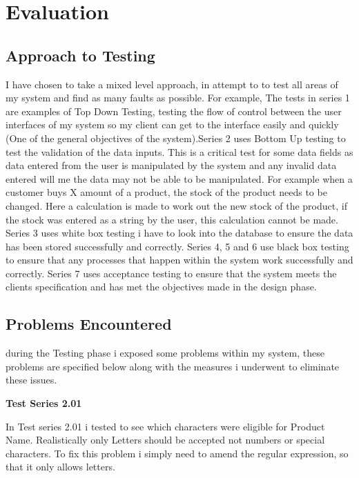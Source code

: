 \section{Evaluation}

\subsection{Approach to Testing}

I have chosen to take a mixed level approach, in attempt to to test all areas of my system and find as many faults as possible. For example,  The tests in series 1 are examples of Top Down Testing, testing the flow of control between the user interfaces of my system so my client can get to the interface easily and quickly (One of the general objectives of the system).Series 2 uses Bottom Up testing to test the validation of the data inputs. This is a critical test for some data fields as data entered from the user is manipulated by the system and any invalid data entered will me the data may not be able to be manipulated. For example when a customer buys X amount of a product, the stock of the product needs to be changed. Here a calculation is made to work out the new stock of the product, if the stock was entered as a string by the user, this calculation cannot be made. Series 3 uses white box testing i have to look into the database to ensure the data has been stored successfully and correctly. Series 4, 5 and 6 use black box testing to ensure that any processes that happen within the system work successfully and correctly. Series 7 uses acceptance testing to ensure that the system meets the clients specification and has met the objectives made in the design phase.

\subsection{Problems Encountered}

during the Testing phase i exposed some problems within my system, these problems are specified below along with the measures i underwent to eliminate these issues. 

\textbf{Test Series 2.01}

In Test series 2.01 i tested to see which characters were eligible for Product Name. Realistically only Letters should be accepted not numbers or special characters. To fix this problem i simply need to amend the regular expression, so that it only allows letters. 


